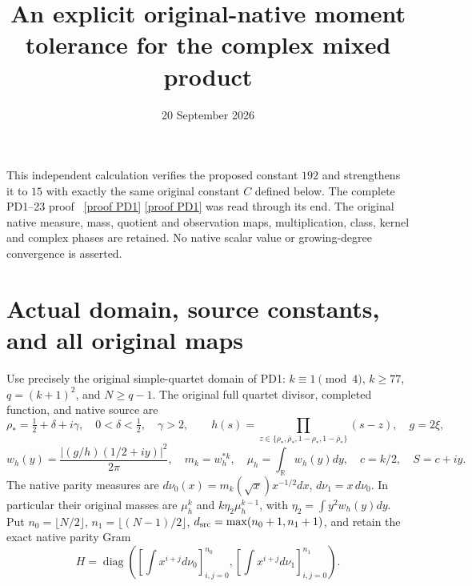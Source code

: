 \documentclass[11pt]{article}
\title{An explicit original-native moment tolerance for the complex mixed product}
\author{}
\date{20 September 2026}
\newcommand{\diag}{\operatorname{diag}}
\begin{document}
\maketitle

This independent calculation verifies the proposed constant $192$
and strengthens it to $15$ with exactly the same original constant
$C$ defined below. The complete PD1--23 proof \cite{PD}%
~\href{https://github.com/KokunoYumeto/zeta-function-research-reader/blob/5992ad50c0f2a06921f1fcaded7b4e38097c0739/workbenches/splitzero-tandem/continuations/20260920-original-kernel-mixed-determinants/providers/PROJECTION_PHASE_DERIVATION.tex\#L22}{[proof PD1]} \href{https://github.com/KokunoYumeto/zeta-function-research-reader/blob/5992ad50c0f2a06921f1fcaded7b4e38097c0739/workbenches/splitzero-tandem/continuations/20260920-original-kernel-mixed-determinants/providers/PROJECTION_PHASE_RETURN.tex\#L25}{[proof PD1]}%
{} was read
through its end. The original native measure, mass, quotient and
observation maps, multiplication, class, kernel and complex phases
are retained. No native scalar value or growing-degree convergence
is asserted.

\section{Actual domain, source constants, and all original maps}

Use precisely the original simple-quartet domain of PD1:
$k\equiv1\pmod4$, $k\ge77$, $q=(k+1)^2$, and $N\ge q-1$.
The original full quartet divisor, completed function, and native
source are
\[
 \rho_*=\tfrac12+\delta+i\gamma,\quad0<\delta<\tfrac12,\quad\gamma>2,
 \qquad
 h(s)=\prod_{z\in\{\rho_*,\bar\rho_*,1-\rho_*,1-\bar\rho_*\}}(s-z),
 \quad g=2\xi,
\]
\[
 w_h(y)=\frac{|(g/h)(1/2+iy)|^2}{2\pi},\quad m_k=w_h^{*k},
 \quad \mu_h=\int_{\mathbb R}w_h(y)dy,\quad c=k/2,\quad S=c+iy.
\]
The native parity measures are
$d\nu_0(x)=m_k(\sqrt x)x^{-1/2}dx$, $d\nu_1=x\,d\nu_0$.
In particular their original masses are $\mu_h^k$ and
$k\eta_2\mu_h^{k-1}$, with $\eta_2=\int y^2w_h(y)dy$.
Put $n_0=\lfloor N/2\rfloor$, $n_1=\lfloor(N-1)/2\rfloor$,
$d_{\rm src}=\max(n_0+1,n_1+1)$, and retain the exact native
parity Gram
\begin{equation}\tag{MC1}\label{eq:H}
 H=\diag\left([\int x^{i+j}d\nu_0]_{i,j=0}^{n_0},
               [\int x^{i+j}d\nu_1]_{i,j=0}^{n_1}\right).
\end{equation}
\end{document}
